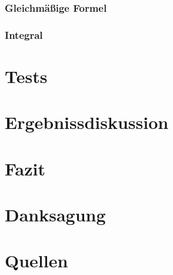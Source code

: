 \documentclass[11pt, titlepage, parskip=half-]{scrreprt}
\begin{document}
\subsection{Gleichmäßige Formel}

\subsection{Integral}

\chapter{Tests}

%
%
\chapter{Ergebnissdiskussion}

\chapter{Fazit}

\newpage
\chapter{Danksagung}

\chapter{Quellen}



\end{document}
